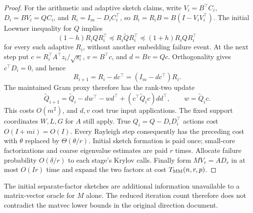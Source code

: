 \documentclass[11pt]{article}
\newcommand{\MM}{T_{\rm MM}}
\begin{document}
\begin{proof}
For the arithmetic and adaptive sketch claims, write \(V_i=B^\top C_i\),
\(D_i=BV_i=QC_i\), and \(R_i=I_m-D_iC_i^\top\), so
\(B_i=R_iB=B(I-V_iV_i^\top)\). The initial Loewner inequality for
\(Q\) implies
\[
 (1-h)R_iQR_i^\top\preceq R_i\widetilde QR_i^\top
                         \preceq(1+h)R_iQR_i^\top
\]
for every such adaptive \(R_i\), without another embedding failure event.
At the next step put
\(c=R_i^\top A^\top z_i/\sqrt{s_i}\),
\(v=B^\top c\), and \(d=Bv=Qc\). Orthogonality gives
\(c^\top D_i=0\), and hence
\[
 R_{i+1}=R_i-dc^\top=(I_m-dc^\top)R_i.
\]
The maintained Gram proxy therefore has the rank-two update
\[
 \widetilde Q_{i+1}
 =\widetilde Q_i-dw^\top-wd^\top
                    +(c^\top\widetilde Q_i c)dd^\top,
 \qquad w=\widetilde Q_i c.
\]
This costs \(O(m^2)\), and \(d,v\) cost true input applications.
The fixed support coordinates \(W,L,G\) for \(A\) still apply.
True \(Q_i=Q-D_iD_i^\top\) actions cost \(O(I+mi)=O(I)\).
Every Rayleigh step consequently has the preceding cost with
\(\theta\) replaced by \(\Theta(\theta/r)\). Initial sketch formation
is paid once; small-core factorizations and coarse eigenvalue estimates are
paid \(r\) times. Allocate failure probability \(O(\delta/r)\) to
each stage's Krylov calls. Finally form \(MV_r=AD_r\) in at most
\(O(Ir)\) time and expand the two factors at cost \(\MM(n,r,p)\).
\end{proof}

The initial separate-factor sketches are additional information unavailable
to a matrix-vector oracle for \(M\) alone. The reduced iteration count
therefore does not contradict the matvec lower bounds in the original
direction document.
\end{document}

